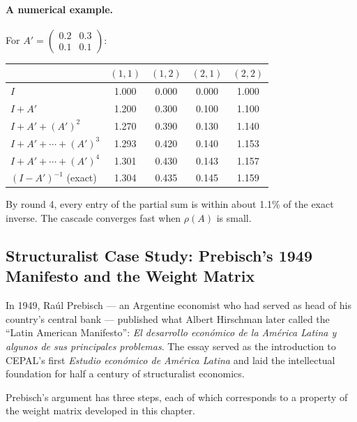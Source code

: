 \documentclass[../structural_economics_book.tex]{subfiles}
\begin{document}
\paragraph{A numerical example.} For $A' = \begin{pmatrix} 0.2 & 0.3 \\ 0.1 & 0.1 \end{pmatrix}$:

\begin{center}
\begin{tabular}{l c c c c}
\toprule
& $(1,1)$ & $(1,2)$ & $(2,1)$ & $(2,2)$ \\
\midrule
$I$ & 1.000 & 0.000 & 0.000 & 1.000 \\
$I + A'$ & 1.200 & 0.300 & 0.100 & 1.100 \\
$I + A' + (A')^2$ & 1.270 & 0.390 & 0.130 & 1.140 \\
$I + A' + \cdots + (A')^3$ & 1.293 & 0.420 & 0.140 & 1.153 \\
$I + A' + \cdots + (A')^4$ & 1.301 & 0.430 & 0.143 & 1.157 \\
$(I - A')^{-1}$ (exact) & 1.304 & 0.435 & 0.145 & 1.159 \\
\bottomrule
\end{tabular}
\end{center}

By round 4, every entry of the partial sum is within about 1.1\% of the exact inverse. The cascade converges fast when $\rho(A)$ is small.


\subsection*{Structuralist Case Study: Prebisch's 1949 Manifesto and the Weight Matrix}

In 1949, Ra\'{u}l Prebisch --- an Argentine economist who had served as head of his country's central bank --- published what Albert Hirschman later called the ``Latin American Manifesto'': \textit{El desarrollo econ\'{o}mico de la Am\'{e}rica Latina y algunos de sus principales problemas}. The essay served as the introduction to CEPAL's first \textit{Estudio econ\'{o}mico de Am\'{e}rica Latina} and laid the intellectual foundation for half a century of structuralist economics.

Prebisch's argument has three steps, each of which corresponds to a property of the weight matrix developed in this chapter.
\end{document}
